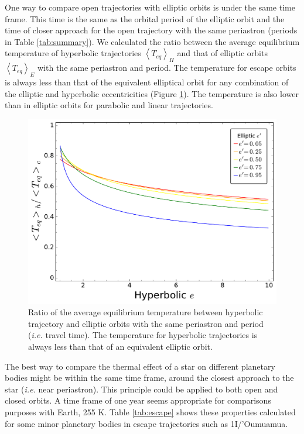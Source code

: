 \documentclass[a4paper,fleqn,usenatbib]{mnras}
\begin{document}
One way to compare open trajectories with elliptic orbits is under the same time frame. This time is the same as the orbital period of the elliptic orbit and the time of closer approach for the open trajectory with the same periastron (periods in Table \ref{tab:summary}). We calculated the ratio between the average equilibrium temperature of hyperbolic trajectories $\left<T_{eq}\right>_H$ and that of elliptic orbits $\left<T_{eq}\right>_E$ with the same periastron and period. The temperature for escape orbits is always less than that of the equivalent elliptical orbit for any combination of the elliptic and hyperbolic eccentricities (Figure \ref{fig4}). The temperature is also lower than in elliptic orbits for parabolic and linear trajectories.


\begin{figure}
\includegraphics[width=\columnwidth]{f4.pdf}
\caption{Ratio of the average equilibrium temperature between hyperbolic trajectory and elliptic orbits with the same periastron and period (\emph{i.e.} travel time). The temperature for hyperbolic trajectories is always less than that of an equivalent elliptic orbit.}
\label{fig4}
\end{figure}

The best way to compare the thermal effect of a star on different planetary bodies might be within the same time frame, around the closest approach to the star (\emph{i.e.} near periastron). This principle could be applied to both open and closed orbits. A time frame of one year seems appropriate for comparisons purposes with Earth, 255 K. Table \ref{tab:escape} shows these properties calculated for some minor planetary bodies in escape trajectories such as 1I/'Oumuamua.
\end{document}
